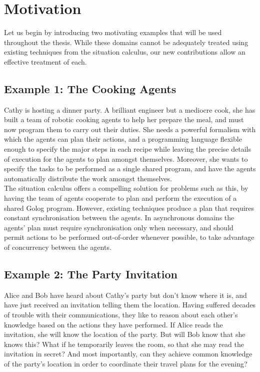 \section{Motivation}

Let us begin by introducing two motivating examples that will be used
throughout the thesis. While these domains cannot be adequately treated
using existing techniques from the situation calculus, our new contributions
allow an effective treatment of each.


\subsection*{Example 1: The Cooking Agents}

Cathy is hosting a dinner party. A brilliant engineer but a mediocre
cook, she has built a team of robotic cooking agents to help her prepare
the meal, and must now program them to carry out their duties. She
needs a powerful formalism with which the agents can plan their actions,
and a programming language flexible enough to specify the major steps
in each recipe while leaving the precise details of execution for
the agents to plan amongst themselves. Moreover, she wants to specify
the tasks to be performed as a single shared program, and have the
agents automatically distribute the work amongst themselves.\\


The situation calculus offers a compelling solution for problems such
as this, by having the team of agents cooperate to plan and perform
the execution of a shared Golog program. However, existing techniques
produce a plan that requires constant synchronisation between the
agents. In asynchronous domains the agents' plan must require synchronisation
only when necessary, and should permit actions to be performed out-of-order
whenever possible, to take advantage of concurrency between the agents.


\subsection*{Example 2: The Party Invitation}

Alice and Bob have heard about Cathy's party but don't know where
it is, and have just received an invitation telling them the location.
Having suffered decades of trouble with their communications, they
like to reason about each other's knowledge based on the actions they
have performed. If Alice reads the invitation, she will know the location
of the party. But will Bob know that she knows this? What if he temporarily
leaves the room, so that she may read the invitation in secret? And
most importantly, can they achieve common knowledge of the party's
location in order to coordinate their travel plans for the evening?\\


